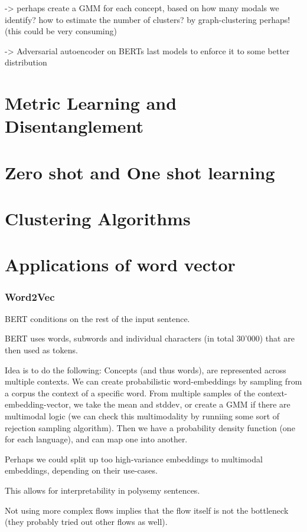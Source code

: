 \documentclass[a4paper,12pt,twoside,openright]{report}
\begin{document}
-> perhaps create a GMM for each concept, based on how many modals we identify? how to estimate the number of clusters? by graph-clustering perhaps! (this could be very consuming)

-> Adversarial autoencoder on BERTs last models to enforce it to some better distribution

\section{Metric Learning and Disentanglement}

\section{Zero shot and One shot learning }

\section{Clustering Algorithms}

\section{Applications of word vector}

\newpage
\subsubsection{Word2Vec}

BERT conditions on the rest of the input sentence.

BERT uses words, subwords and individual characters (in total 30'000) that are then used as tokens.

Idea is to do the following:
Concepts (and thus words), are represented across multiple contexts.
We can create probabilistic word-embeddings by sampling from a corpus the context of a specific word.
From multiple samples of the context-embedding-vector, we take the mean and stddev, or create a GMM if there are multimodal logic (we can check this multimodality by runniing some sort of rejection sampling algorithm).
Then we have a probability density function (one for each language), and can map one into another.

Perhaps we could split up too high-variance embeddings to multimodal embeddings, depending on their use-cases.

This allows for interpretability in polysemy sentences.

Not using more complex flows implies that the flow itself is not the bottleneck (they probably tried out other flows as well).
\end{document}

